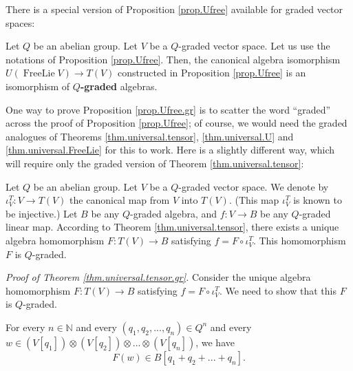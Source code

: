 \documentclass[etingof-lie.tex]{subfiles}
\begin{document}
\begin{verlong}
There is a special version of Proposition \ref{prop.Ufree} available for
graded vector spaces:

\begin{proposition}
\label{prop.Ufree.gr}Let $Q$ be an abelian group. Let $V$ be a $Q$-graded
vector space. Let us use the notations of Proposition \ref{prop.Ufree}. Then,
the canonical algebra isomorphism $U\left(  \operatorname*{FreeLie}V\right)
\rightarrow T\left(  V\right)  $ constructed in Proposition \ref{prop.Ufree}
is an isomorphism of $Q$\textbf{-graded} algebras.
\end{proposition}

One way to prove Proposition \ref{prop.Ufree.gr} is to scatter the word
``graded'' across the proof of Proposition \ref{prop.Ufree}; of course, we
would need the graded analogues of Theorems \ref{thm.universal.tensor},
\ref{thm.universal.U} and \ref{thm.universal.FreeLie} for this to work. Here
is a slightly different way, which will require only the graded version of
Theorem \ref{thm.universal.tensor}:

\begin{theorem}
\label{thm.universal.tensor.gr}Let $Q$ be an abelian group. Let $V$ be a
$Q$-graded vector space. We denote by $\iota_{V}^{T}:V\rightarrow T\left(
V\right)  $ the canonical map from $V$ into $T\left(  V\right)  $. (This map
$\iota_{V}^{T}$ is known to be injective.) Let $B$ be any $Q$-graded algebra,
and $f:V\rightarrow B$ be any $Q$-graded linear map. According to Theorem
\ref{thm.universal.tensor}, there exists a unique algebra homomorphism
$F:T\left(  V\right)  \rightarrow B$ satisfying $f=F\circ\iota_{V}^{T}$. This
homomorphism $F$ is $Q$-graded.
\end{theorem}

\textit{Proof of Theorem \ref{thm.universal.tensor.gr}.} Consider the unique
algebra homomorphism $F:T\left(  V\right)  \rightarrow B$ satisfying
$f=F\circ\iota_{V}^{T}$. We need to show that this $F$ is $Q$-graded.

For every $n\in\mathbb{N}$ and every $\left(  q_{1},q_{2},...,q_{n}\right)
\in Q^{n}$ and every $w\in\left(  V\left[  q_{1}\right]  \right)
\otimes\left(  V\left[  q_{2}\right]  \right)  \otimes...\otimes\left(
V\left[  q_{n}\right]  \right)  $, we have%
\begin{equation}
F\left(  w\right)  \in B\left[  q_{1}+q_{2}+...+q_{n}\right]  .
\label{pf.universal.tensor.gr.1}%
\end{equation}



\end{verlong}
\end{document}
